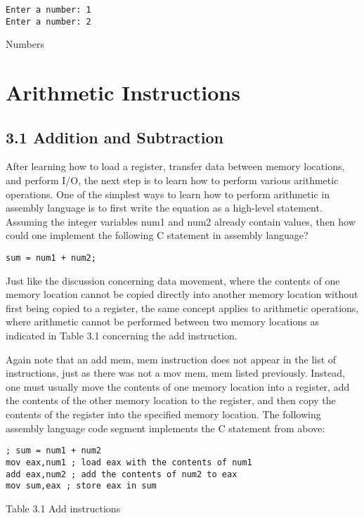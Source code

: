 \documentclass[10pt]{article}
\begin{document}
\begin{verbatim}
Enter a number: 1
Enter a number: 2
\end{verbatim}

Numbers

\section*{Arithmetic Instructions}
\subsection*{3.1 Addition and Subtraction}
After learning how to load a register, transfer data between memory locations, and perform I/O, the next step is to learn how to perform various arithmetic operations. One of the simplest ways to learn how to perform arithmetic in assembly language is to first write the equation as a high-level statement. Assuming the integer variables num1 and num2 already contain values, then how could one implement the following C statement in assembly language?

\begin{verbatim}
sum = num1 + num2;
\end{verbatim}

Just like the discussion concerning data movement, where the contents of one memory location cannot be copied directly into another memory location without first being copied to a register, the same concept applies to arithmetic operations, where arithmetic cannot be performed between two memory locations as indicated in Table 3.1 concerning the add instruction.

Again note that an add mem, mem instruction does not appear in the list of instructions, just as there was not a mov mem, mem listed previously. Instead, one must usually move the contents of one memory location into a register, add the contents of the other memory location to the register, and then copy the contents of the register into the specified memory location. The following assembly language code segment implements the C statement from above:

\begin{verbatim}
; sum = num1 + num2
mov eax,num1 ; load eax with the contents of num1
add eax,num2 ; add the contents of num2 to eax
mov sum,eax ; store eax in sum
\end{verbatim}

Table 3.1 Add instructions
\end{document}
